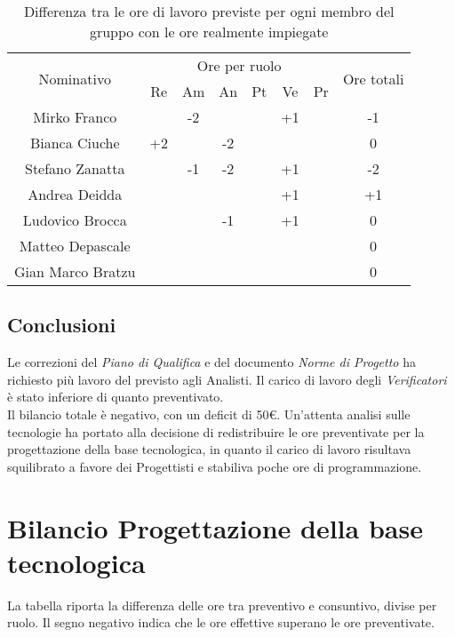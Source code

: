 \begin{flushleft}
    \begin{table}[!h]
	\begin{center}
		\begin{tabularx}{\textwidth}{|c|cccccc|c|}
			
			\hline
			\multirow{2}{*}{Nominativo} & \multicolumn{6}{c|}{Ore per ruolo} & \multirow{2}{*}{Ore totali} \\ \cline{2-7}
			& Re & Am & An & Pt & Ve & Pr &      \\ \hline
			\endhead
			Mirko Franco       &  & -2  & &  & +1 &   & -1   \\ \hline
			Bianca Ciuche      & +2 &    & -2 &    &  &   & 0   \\ \hline
			Stefano Zanatta    &   & -1 & -2 &  & +1 &  & -2    \\ \hline
			Andrea Deidda      &   &  &   &   & +1  &   & +1	\\ \hline
			Ludovico Brocca    &   &  & -1 &   & +1 &   & 0     \\ \hline
			Matteo Depascale   &   &  &   &   &   &   & 0  		\\ \hline
			Gian Marco Bratzu  &   &  &   &   &  &   & 0        \\ \hline
			
		\end{tabularx}
		\caption{Differenza tra le ore di lavoro previste per ogni membro del gruppo con le ore realmente impiegate }
	\end{center}
\end{table}

  \subsection{Conclusioni}
  Le correzioni del \textit{Piano di Qualifica} e del documento \textit{Norme di Progetto} ha richiesto più lavoro del previsto agli {Analisti}. Il carico di lavoro degli \textit{Verificatori} è stato inferiore di quanto preventivato.\\ Il bilancio totale è negativo, con un deficit di 50\euro.
  Un'attenta analisi sulle tecnologie ha portato alla decisione di redistribuire le ore preventivate per la progettazione della base tecnologica, in quanto il carico di lavoro risultava squilibrato a favore dei Progettisti e stabiliva poche ore di programmazione.

\newpage	
	\section{Bilancio Progettazione della base tecnologica} 
	\label{BilProgBT}
  La tabella riporta la differenza delle ore tra preventivo e consuntivo, divise per ruolo. Il segno negativo indica che le ore effettive superano le ore preventivate.
  

\end{flushleft}
